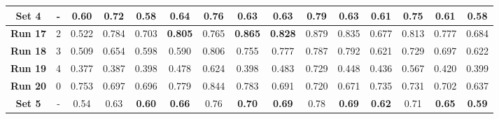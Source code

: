 \begin{table}[!ht]
{\begin{tabular}{|c|c|ccc|ccc|ccc|c|c|c|c|}
		\hline
		
		\textbf{Set 4} & - & \multicolumn{1}{c|}{\textbf{0.60}} & \multicolumn{1}{c|}{\textbf{0.72}} & 0.58 & \multicolumn{1}{c|}{0.64} & \multicolumn{1}{c|}{\textbf{0.76}} & 0.63 & \multicolumn{1}{c|}{0.63} & \multicolumn{1}{c|}{\textbf{0.79}} & 0.63 & 0.61 & \textbf{0.75} & 0.61 & 0.58 \\
		
		\hline
		\hline
		
		\textbf{Run 17} & 2 & \multicolumn{1}{c|}{0.522} & \multicolumn{1}{c|}{0.784} & 0.703 & \multicolumn{1}{c|}{\textbf{0.805}} & \multicolumn{1}{c|}{0.765} & \textbf{0.865} & \multicolumn{1}{c|}{\textbf{0.828}} & \multicolumn{1}{c|}{0.879} & 0.835 & 0.677 & 0.813 & 0.777 & 0.684 \\
	
		\textbf{Run 18} & 3 & \multicolumn{1}{c|}{0.509} & \multicolumn{1}{c|}{0.654} & 0.598 & \multicolumn{1}{c|}{0.590} & \multicolumn{1}{c|}{0.806} & 0.755 & \multicolumn{1}{c|}{0.777} & \multicolumn{1}{c|}{0.787} & 0.792 & 0.621 & 0.729 & 0.697 & 0.622 \\
					
		\textbf{Run 19} & 4 & \multicolumn{1}{c|}{0.377} & \multicolumn{1}{c|}{0.387} & 0.398 & \multicolumn{1}{c|}{0.478} & \multicolumn{1}{c|}{0.624} & 0.398 & \multicolumn{1}{c|}{0.483} & \multicolumn{1}{c|}{0.729} & 0.448 & 0.436 & 0.567 & 0.420 & 0.399 \\
		
		\textbf{Run 20} & 0 & \multicolumn{1}{c|}{0.753} & \multicolumn{1}{c|}{0.697} & 0.696 & \multicolumn{1}{c|}{0.779} & \multicolumn{1}{c|}{0.844} & 0.783 & \multicolumn{1}{c|}{0.691} & \multicolumn{1}{c|}{0.720} & 0.671 & 0.735 & 0.731 & 0.702 & 0.637 \\
		
		\hline
		
		\textbf{Set 5} & - & \multicolumn{1}{c|}{0.54} & \multicolumn{1}{c|}{0.63} & \textbf{0.60} & \multicolumn{1}{c|}{\textbf{0.66}} & \multicolumn{1}{c|}{0.76} & \textbf{0.70} & \multicolumn{1}{c|}{\textbf{0.69}} & \multicolumn{1}{c|}{0.78} & \textbf{0.69} & \textbf{0.62} & 0.71 & \textbf{0.65} & \textbf{0.59} \\
		
		\hline
			
	\end{tabular}}
	\label{tab:Experiment1.3FourPatches}
\end{table}

